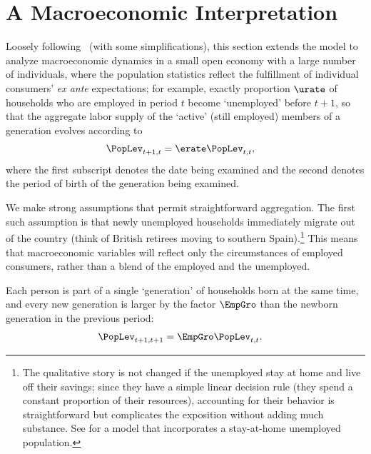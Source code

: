 \documentclass{handout}
\begin{document}
\section{A Macroeconomic Interpretation}

Loosely following~\cite{cjSOE} (with some simplifications), this section extends the model to analyze macroeconomic dynamics in a
small open economy with a large number of individuals, where the
population statistics reflect the fulfillment of individual consumers'
{\it ex ante} expectations; for example, exactly proportion $\urate$
of households who are employed in period $t$ become `unemployed' before
$t+1$, so that the aggregate labor supply of the `active' (still employed) members of a generation
evolves according to
\begin{equation}\begin{gathered}\begin{aligned}
  \PopLev_{t+1,t} & =  \erate \PopLev_{t,t}
,
\end{aligned}\end{gathered}\end{equation}
where the first subscript denotes the date being examined and the second denotes
the period of birth of the generation being examined.

We make strong assumptions that permit straightforward aggregation. The first such assumption is that newly unemployed households immediately migrate out of the
country (think of British retirees moving to southern
Spain).\footnote{The qualitative story is not changed if the unemployed stay at home and live off their savings; since they have a simple linear
  decision rule (they spend a constant proportion of their resources),
  accounting for their behavior is straightforward but
  complicates the exposition without adding much substance.  See \cite{cjSOE} for a model that incorporates a stay-at-home unemployed population.}
This means that macroeconomic variables will reflect only the circumstances of 
employed consumers, rather than a blend of the employed and the unemployed.

Each person is part of a single `generation' of households born at the
same time, and every new generation is larger by the factor $\EmpGro$
than the newborn generation in the previous period:
\begin{equation}\begin{gathered}\begin{aligned}
  \PopLev_{t+1,t+1} & =  \EmpGro \PopLev_{t,t}
.
\end{aligned}\end{gathered}\end{equation}
\end{document}
